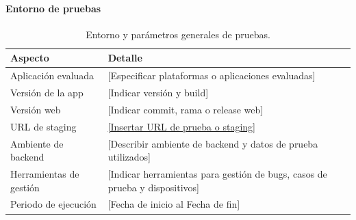 \documentclass[12pt, atypical, journal]{article}
\begin{document}
\paragraph{Entorno de pruebas}
\begin{table}[H]
\centering
\small
\begin{tabular}{|l|p{9cm}|}
\hline
\textbf{Aspecto} & \textbf{Detalle} \\ \hline
Aplicación evaluada & [Especificar plataformas o aplicaciones evaluadas] \\ \hline
Versión de la app & [Indicar versión y build] \\ \hline
Versión web & [Indicar commit, rama o release web] \\ \hline
URL de staging & \url{[Insertar URL de prueba o staging]} \\ \hline
Ambiente de backend & [Describir ambiente de backend y datos de prueba utilizados] \\ \hline
Herramientas de gestión & [Indicar herramientas para gestión de bugs, casos de prueba y dispositivos] \\ \hline
Periodo de ejecución & [Fecha de inicio al Fecha de fin] \\ \hline
\end{tabular}
\caption{Entorno y parámetros generales de pruebas.}
\label{tab:qa_entorno}
\end{table}
\end{document}
